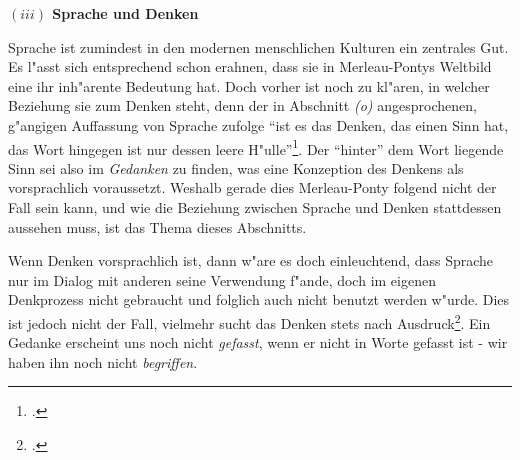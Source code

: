 \documentclass[a4paper, 12pt]{article}
\begin{document}
\begin{onehalfspace}
\vspace{5mm}

\noindent\textbf{$(iii)$ Sprache und Denken}

\noindent Sprache ist zumindest in den modernen menschlichen Kulturen ein zentrales Gut. Es l"asst sich entsprechend schon erahnen, dass sie in Merleau-Pontys Weltbild eine ihr inh"arente Bedeutung hat. Doch vorher ist noch zu kl"aren, in welcher Beziehung sie zum Denken steht, denn der in Abschnitt \emph{(o)} angesprochenen, g"angigen Auffassung von Sprache zufolge "`ist es das Denken, das einen Sinn hat, das Wort hingegen ist nur dessen leere H"ulle"'\footnote{\Cite[S. 210]{merleau1966phanomenologie}.}. Der "`hinter"' dem Wort liegende Sinn sei also im \emph{Gedanken} zu finden, was eine Konzeption des Denkens als vorsprachlich voraussetzt. Weshalb gerade dies Merleau-Ponty folgend nicht der Fall sein kann, und wie die Beziehung zwischen Sprache und Denken stattdessen aussehen muss, ist das Thema dieses Abschnitts. 

Wenn Denken vorsprachlich ist, dann w"are es doch einleuchtend, dass Sprache nur im Dialog mit anderen seine Verwendung f"ande, doch im eigenen Denkprozess nicht gebraucht und folglich auch nicht benutzt werden w"urde. Dies ist jedoch nicht der Fall, vielmehr sucht das Denken stets nach Ausdruck\footnote{\cite[Vgl.][S. 216]{merleau1966phanomenologie}.}. Ein Gedanke erscheint uns noch nicht \emph{gefasst}, wenn er nicht in Worte gefasst ist - wir haben ihn noch nicht \emph{begriffen}. 


\end{onehalfspace}
\end{document}
